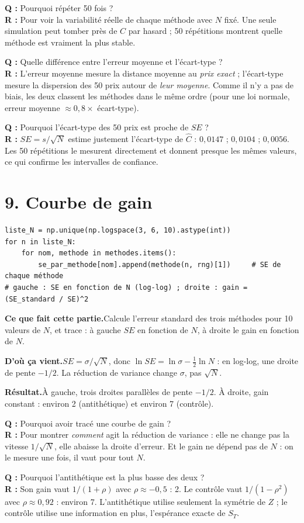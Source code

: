 \documentclass[11pt,a4paper]{article}
\newcommand{\quoi}[1]{\par\noindent\textbf{\color{bleu}Ce que fait cette partie.}\enspace #1\par}
\newcommand{\source}[1]{\par\noindent\textbf{\color{orange}D'où ça vient.}\enspace #1\par}
\newcommand{\resultat}[1]{\par\noindent\textbf{\color{vert}Résultat.}\enspace #1\par}
\newcommand{\prof}[2]{\begin{tcolorbox}[colback=orange!6,colframe=orange!80,boxrule=0.4pt,arc=2pt,left=5pt,right=5pt,top=2pt,bottom=2pt]\small\textbf{Q :} #1\\[1pt]\textbf{R :} #2\end{tcolorbox}}
\newcommand{\sect}[1]{\clearpage\section{#1}}
\begin{document}
\prof{Pourquoi répéter 50 fois ?}{Pour voir la variabilité réelle de chaque méthode avec $N$ fixé. Une seule simulation peut tomber près de $C$ par hasard ; 50 répétitions montrent quelle méthode est vraiment la plus stable.}
\prof{Quelle différence entre l'erreur moyenne et l'écart-type ?}{L'erreur moyenne mesure la distance moyenne au \emph{prix exact} ; l'écart-type mesure la dispersion des 50 prix autour de \emph{leur moyenne}. Comme il n'y a pas de biais, les deux classent les méthodes dans le même ordre (pour une loi normale, erreur moyenne $\approx 0{,}8\times$ écart-type).}
\prof{Pourquoi l'écart-type des 50 prix est proche de $SE$ ?}{$SE = s/\sqrt N$ estime justement l'écart-type de $\hat C$ : $0{,}0147$ ; $0{,}0104$ ; $0{,}0056$. Les 50 répétitions le mesurent directement et donnent presque les mêmes valeurs, ce qui confirme les intervalles de confiance.}

\sect{9. Courbe de gain}
\begin{lstlisting}
liste_N = np.unique(np.logspace(3, 6, 10).astype(int))
for n in liste_N:
    for nom, methode in methodes.items():
        se_par_methode[nom].append(methode(n, rng)[1])     # SE de chaque méthode
# gauche : SE en fonction de N (log-log) ; droite : gain = (SE_standard / SE)^2
\end{lstlisting}
\quoi{Calcule l'erreur standard des trois méthodes pour 10 valeurs de $N$, et trace : à gauche $SE$ en fonction de $N$, à droite le gain en fonction de $N$.}
\source{$SE = \sigma/\sqrt N$, donc $\ln SE = \ln\sigma - \frac12\ln N$ : en log-log, une droite de pente $-1/2$. La réduction de variance change $\sigma$, pas $\sqrt N$.}
\resultat{À gauche, trois droites parallèles de pente $-1/2$. À droite, gain constant : environ 2 (antithétique) et environ 7 (contrôle).}
\prof{Pourquoi avoir tracé une courbe de gain ?}{Pour montrer \emph{comment} agit la réduction de variance : elle ne change pas la vitesse $1/\sqrt N$, elle abaisse la droite d'erreur. Et le gain ne dépend pas de $N$ : on le mesure une fois, il vaut pour tout $N$.}
\prof{Pourquoi l'antithétique est la plus basse des deux ?}{Son gain vaut $1/(1+\rho)$ avec $\rho\approx-0{,}5$ : 2. Le contrôle vaut $1/(1-\rho^2)$ avec $\rho\approx0{,}92$ : environ 7. L'antithétique utilise seulement la symétrie de $Z$ ; le contrôle utilise une information en plus, l'espérance exacte de $S_T$.}
\end{document}
